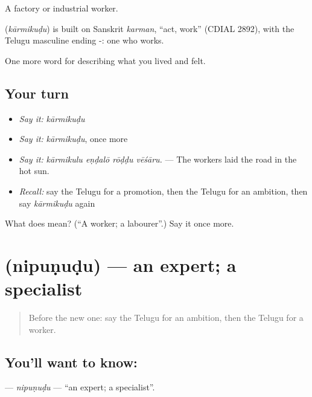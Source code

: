 A factory or industrial worker.

\begin{cousinweb}
\textbf{} (\emph{kārmikuḍu}) is built on Sanskrit \emph{karman}, \textquotedblleft{}act, work\textquotedblright{} (CDIAL 2892), with the Telugu masculine ending -: one who works.
\end{cousinweb}

\begin{grammarlens}[title={What you've built}]
One more word for describing what you lived and felt.
\end{grammarlens}

\subsection*{Your turn}
\begin{itemize}
\raggedright
  \item \emph{Say it:} \emph{kārmikuḍu}
  \item \emph{Say it:} \emph{kārmikuḍu}, once more
  \item \emph{Say it:} \emph{kārmikulu eṇḍalō rōḍḍu vēśāru.} — The workers laid the road in the hot sun.
  \item \emph{Recall:} say the Telugu for a promotion, then the Telugu for an ambition, then say \emph{kārmikuḍu} again
\end{itemize}

\begin{tcolorbox}[breakable,colback=teal!4,colframe=teal!35!black,title={Before you move on}]
What does  mean? (\textquotedblleft{}A worker; a labourer\textquotedblright{}.) Say it once more.
\end{tcolorbox}
\section[\texorpdfstring{\te{నిపుణుడు} (nipuṇuḍu)}{నిపుణుడు (nipuṇuḍu)}]{ (nipuṇuḍu) — an expert; a specialist}

\label{lesson:TE-C523-nipunudu}



\begin{quote}
Before the new one: say the Telugu for an ambition, then the Telugu for a worker.
\end{quote}

\subsection*{You'll want to know: }
\textbf{} — \emph{nipuṇuḍu} — \textquotedblleft{}an expert; a specialist\textquotedblright{}.

